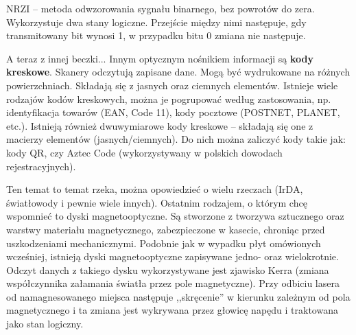 NRZI -- metoda odwzorowania sygnału binarnego, bez powrotów do zera. Wykorzystuje dwa stany logiczne. Przejście między nimi następuje, gdy transmitowany bit wynosi 1, w przypadku bitu 0 zmiana nie następuje.

A teraz z innej beczki... Innym optycznym nośnikiem informacji są \textbf{kody kreskowe}. Skanery odczytują zapisane dane. Mogą być wydrukowane na różnych powierzchniach. Składają się z jasnych oraz ciemnych elementów. Istnieje wiele rodzajów kodów kreskowych, można je pogrupować według zastosowania, np. identyfikacja towarów (EAN, Code 11), kody pocztowe (POSTNET, PLANET, etc.). Istnieją również dwuwymiarowe kody kreskowe -- składają się one z macierzy elementów (jasnych/ciemnych). Do nich można zaliczyć kody takie jak: kody QR, czy Aztec Code (wykorzystywany w polskich dowodach rejestracyjnych).

Ten temat to temat rzeka, można opowiedzieć o wielu rzeczach (IrDA, światłowody i pewnie wiele innych). Ostatnim rodzajem, o którym chcę wspomnieć to dyski magnetooptyczne. Są stworzone z tworzywa sztucznego oraz warstwy materiału magnetycznego, zabezpieczone w kasecie, chroniąc przed uszkodzeniami mechanicznymi. Podobnie jak w wypadku płyt omówionych wcześniej, istnieją dyski magnetooptyczne zapisywane jedno- oraz wielokrotnie. Odczyt danych z takiego dysku wykorzystywane jest zjawisko Kerra (zmiana współczynnika załamania światła przez pole magnetyczne). Przy odbiciu lasera od namagnesowanego miejsca następuje ,,skręcenie'' w kierunku zależnym od pola magnetycznego i ta zmiana jest wykrywana przez głowicę napędu i traktowana jako stan logiczny.